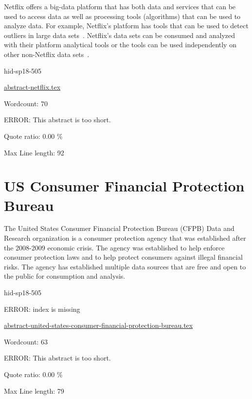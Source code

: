 Netflix offers a big-data platform that has both data and services that can be
used to access data as well as processing tools (algorithms) that can be used
to analyze data.  For example, Netflix's platform has tools that can be used to
detect outliers in large data sets~\cite{hid-sp18-505-Wong2015}.  Netflix's data sets can be
consumed and analyzed with their platform analytical tools or the tools can be
used independently on other non-Netflix data sets~\cite{hid-sp18-505-Netflix2018}.


\begin{IU}

hid-sp18-505

\href{https://github.com/cloudmesh-community/hid-sp18-505/blob/master//technology/abstract-netflix.tex}{abstract-netflix.tex}

 

Wordcount: 70

ERROR: This abstract is too short.


Quote ratio: 0.00 \%
 
Max Line length: 92
\end{IU}

\section{US Consumer Financial Protection Bureau}

The United States Consumer Financial Protection Bureau (CFPB) Data and Research
organization is a consumer protection agency that was established after the
2008-2009 economic crisis.  The agency was established to help enforce consumer
protection laws and to help protect consumers against illegal financial risks.
The agency has established multiple data sources that are free and open to the
public for consumption and analysis\cite{hid-sp18-505-CFPB2018}.


\begin{IU}

hid-sp18-505

ERROR: index is missing

\href{https://github.com/cloudmesh-community/hid-sp18-505/blob/master//technology/abstract-united-states-consumer-financial-protection-bureau.tex}{abstract-united-states-consumer-financial-protection-bureau.tex}

 

Wordcount: 63

ERROR: This abstract is too short.


Quote ratio: 0.00 \%
 
Max Line length: 79
\end{IU}

